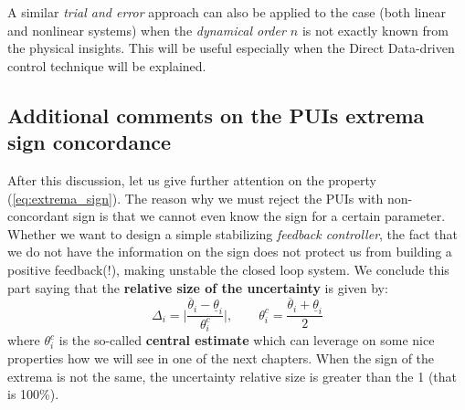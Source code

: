 \noindent
\begin{remark}
    A similar \textit{trial and error} approach can also be applied to the case (both linear and nonlinear systems) when the \textit{dynamical order $n$} is not exactly known from the physical insights. This will be useful especially when the Direct Data-driven control technique will be explained.
\end{remark}

\noindent
\subsection{Additional comments on the PUIs extrema sign concordance}
After this discussion, let us give further attention on the property (\ref{eq:extrema_sign}). The reason why we must reject the PUIs with non-concordant sign is that we cannot even know the sign for a certain parameter. Whether we want to design a simple stabilizing \textit{feedback controller}, the fact that we do not have the information on the sign does not protect us from building a positive feedback(!), making unstable the closed loop system. We conclude this part saying that the \textbf{relative size of the uncertainty} is given by: 
\begin{equation}
    \Delta_i = \bigg\vert \frac{\overline{\theta}_i-\underline{\theta}_i}{\theta_i^c} \bigg\vert, \qquad
    \theta_i^c = \frac{\overline{\theta}_i+\underline{\theta}_i}{2}
\end{equation}
where $\theta_i^c$ is the so-called \textbf{central estimate}  which can leverage on some nice properties how we will see in one of the next chapters. When the sign of the extrema is not the same, the uncertainty relative size is greater than the 1 (that is 100\%).


